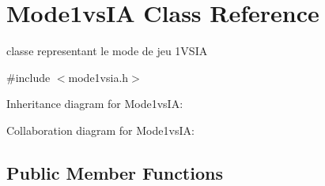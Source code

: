 \hypertarget{class_mode1vs_i_a}{}\section{Mode1vs\+IA Class Reference}
\label{class_mode1vs_i_a}


classe representant le mode de jeu 1\+V\+S\+IA  




{\ttfamily \#include $<$mode1vsia.\+h$>$}



Inheritance diagram for Mode1vs\+IA\+:


Collaboration diagram for Mode1vs\+IA\+:
\subsection*{Public Member Functions}
